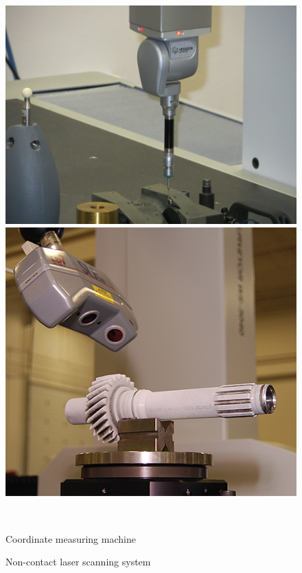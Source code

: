 \documentclass[a4paper, twoside, 11pt]{report}
\begin{document}
\begin{figure}[h]
  \centering
  \begin{minipage}[t]{0.4\textwidth}
    \includegraphics[width=\textwidth]{scanningMachine1}
  \end{minipage}
  \hfill
  \begin{minipage}[t]{0.4\textwidth}
    \includegraphics[width=\textwidth]{scanningMachine2}
  \end{minipage}
  \\[5pt]
  \begin{minipage}[b]{0.4\textwidth}
    \caption{Coordinate measuring machine}
  \end{minipage}
  \hfill
  \begin{minipage}[b]{0.4\textwidth}
    \caption{Non-contact laser scanning system}
  \end{minipage}
\end{figure}
%
\end{document}
